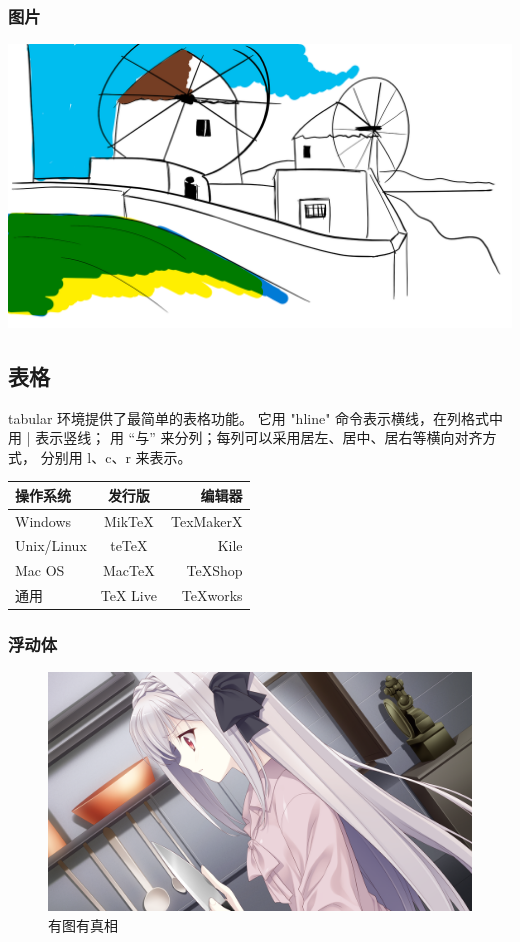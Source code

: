 \documentclass[UTF8]{ctexart}
\begin{document}
     \subsubsection{图片}
         \includegraphics[width = .8\textwidth]{草图.png}
 \subsection{表格}
     tabular 环境提供了最简单的表格功能。
     它用 "hline" 命令表示横线，在列格式中用 | 表示竖线；
     用 “与” 来分列；每列可以采用居左、居中、居右等横向对齐方式，
     分别用 l、c、r 来表示。\\
     \begin{tabular}{|l|c|r|}
         \hline
         操作系统   & 发行版   & 编辑器    \\
         \hline
         Windows    & MikTeX   & TexMakerX \\
         \hline
         Unix/Linux & teTeX    & Kile      \\
         \hline
         Mac OS     & MacTeX   & TeXShop   \\
         \hline
         通用       & TeX Live & TeXworks  \\
         \hline
     \end{tabular}
     \subsubsection{浮动体}
         \begin{figure}[htbp]
             \centering
             \includegraphics[width = .8\textwidth]{lun02a.png}
             \caption{有图有真相}
             \label{fig:myphoto}
         \end{figure}
\end{document}
